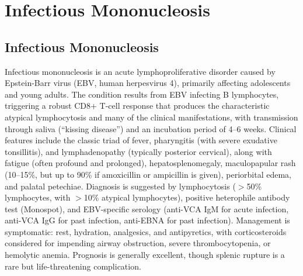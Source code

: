 \section{Infectious Mononucleosis}








\label{sec:section:Infectious Mononucleosis}

\subsection{Infectious Mononucleosis}
\label{sec:Infectious Mononucleosis}
Infectious mononucleosis is an acute lymphoproliferative disorder caused by Epstein-Barr virus (EBV, human herpesvirus 4), primarily affecting adolescents and young adults. The condition results from EBV infecting B lymphocytes, triggering a robust CD8+ T-cell response that produces the characteristic atypical lymphocytosis and many of the clinical manifestations, with transmission through saliva (``kissing disease'') and an incubation period of 4--6 weeks. Clinical features include the classic triad of fever, pharyngitis (with severe exudative tonsillitis), and lymphadenopathy (typically posterior cervical), along with fatigue (often profound and prolonged), hepatosplenomegaly, maculopapular rash (10--15\%, but up to 90\% if amoxicillin or ampicillin is given), periorbital edema, and palatal petechiae. Diagnosis is suggested by lymphocytosis ($>$50\% lymphocytes, with $>$10\% atypical lymphocytes), positive heterophile antibody test (Monospot), and EBV-specific serology (anti-VCA IgM for acute infection, anti-VCA IgG for past infection, anti-EBNA for past infection). Management is symptomatic: rest, hydration, analgesics, and antipyretics, with corticosteroids considered for impending airway obstruction, severe thrombocytopenia, or hemolytic anemia. Prognosis is generally excellent, though splenic rupture is a rare but life-threatening complication.

